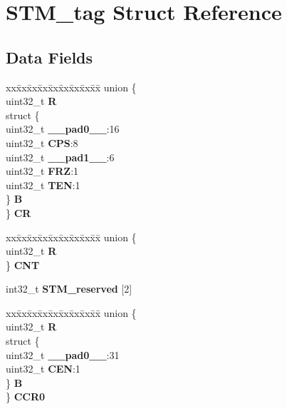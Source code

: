 \hypertarget{structSTM__tag}{}\section{S\+T\+M\+\_\+tag Struct Reference}
\label{structSTM__tag}
\subsection*{Data Fields}
\begin{DoxyCompactItemize}
\item 
\mbox{\label{structSTM__tag_a3b4e5ab2e20f16ee48a9ff85d0668f53}} 
\begin{tabbing}
xx\=xx\=xx\=xx\=xx\=xx\=xx\=xx\=xx\=\kill
union \{\\
\>uint32\_t {\bfseries R}\\
\>struct \{\\
\>\>uint32\_t {\bfseries \_\_pad0\_\_}:16\\
\>\>uint32\_t {\bfseries CPS}:8\\
\>\>uint32\_t {\bfseries \_\_pad1\_\_}:6\\
\>\>uint32\_t {\bfseries FRZ}:1\\
\>\>uint32\_t {\bfseries TEN}:1\\
\>\} {\bfseries B}\\
\} {\bfseries CR}\\

\end{tabbing}\item 
\mbox{\label{structSTM__tag_a25b808a35c18d65f9d32b0b64221d1b5}} 
\begin{tabbing}
xx\=xx\=xx\=xx\=xx\=xx\=xx\=xx\=xx\=\kill
union \{\\
\>uint32\_t {\bfseries R}\\
\} {\bfseries CNT}\\

\end{tabbing}\item 
\mbox{\label{structSTM__tag_a591a94005a9d4d10c3bfa076fb4a6f0f}} 
int32\+\_\+t {\bfseries S\+T\+M\+\_\+reserved} \mbox{[}2\mbox{]}
\item 
\mbox{\label{structSTM__tag_a9dfee63fd539d1d411c721718934846c}} 
\begin{tabbing}
xx\=xx\=xx\=xx\=xx\=xx\=xx\=xx\=xx\=\kill
union \{\\
\>uint32\_t {\bfseries R}\\
\>struct \{\\
\>\>uint32\_t {\bfseries \_\_pad0\_\_}:31\\
\>\>uint32\_t {\bfseries CEN}:1\\
\>\} {\bfseries B}\\
\} {\bfseries CCR0}\\


\end{tabbing}
\end{DoxyCompactItemize}
